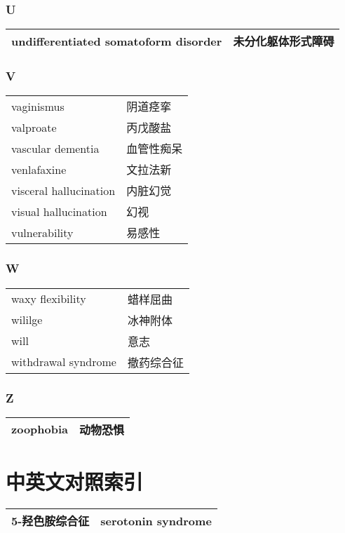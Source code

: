 \subsection*{U}

\begin{longtable}[]{@{}ll@{}}
\toprule
\endhead
undifferentiated somatoform disorder & 未分化躯体形式障碍\tabularnewline
\bottomrule
\end{longtable}

\subsection*{V}

\begin{longtable}[]{@{}ll@{}}
\toprule
\endhead
vaginismus & 阴道痉挛\tabularnewline
valproate & 丙戊酸盐\tabularnewline
vascular dementia & 血管性痴呆\tabularnewline
venlafaxine & 文拉法新\tabularnewline
visceral hallucination & 内脏幻觉\tabularnewline
visual hallucination & 幻视\tabularnewline
vulnerability & 易感性\tabularnewline
\bottomrule
\end{longtable}

\subsection*{W}

\begin{longtable}[]{@{}ll@{}}
\toprule
\endhead
waxy flexibility & 蜡样屈曲\tabularnewline
wililge & 冰神附体\tabularnewline
will & 意志\tabularnewline
withdrawal syndrome & 撤药综合征\tabularnewline
\bottomrule
\end{longtable}

\subsection*{Z}

\begin{longtable}[]{@{}ll@{}}
\toprule
\endhead
zoophobia & 动物恐惧\tabularnewline
\bottomrule
\end{longtable}

\protect\hypertarget{text00028.html}{}{}

\chapter{中英文对照索引}

\begin{longtable}[]{@{}ll@{}}
\toprule
\endhead
5-羟色胺综合征 & serotonin syndrome\tabularnewline
\bottomrule
\end{longtable}

